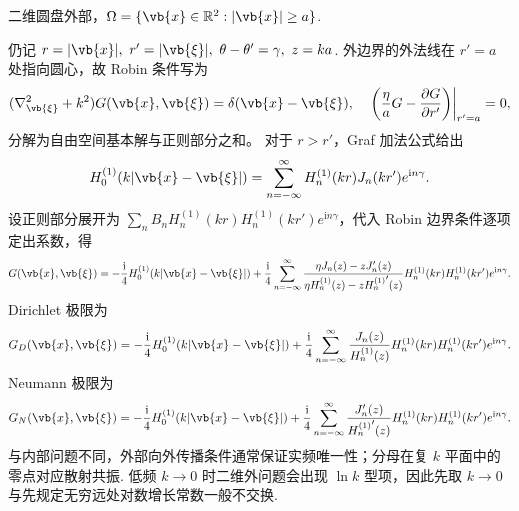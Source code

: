 \begin{example}
	二维圆盘外部，\(\Omega=\{\vb{x}\in\mathbb{R}^2:|\vb{x}|\geq a\}\).
	
	仍记 \(r=|\vb{x}|,\ r'=|\vb{\xi}|,\ \theta-\theta'=\gamma,\ z=ka\). 外边界的外法线在 \(r'=a\) 处指向圆心，故 Robin 条件写为
	\begin{equation*}
		(\nabla_{\vb{\xi}}^2+k^2)G(\vb{x},\vb{\xi})=\delta(\vb{x}-\vb{\xi}),
		\quad
		\left.\left(\frac{\eta}{a}G-\frac{\partial G}{\partial r'}\right)\right|_{r'=a}=0,
	\end{equation*}
	分解为自由空间基本解与正则部分之和。
	对于 \(r>r'\)，Graf 加法公式给出
	\begin{equation*}
		H_0^{(1)}(k|\vb{x}-\vb{\xi}|)=\sum_{n=-\infty}^{\infty}H_n^{(1)}(kr)J_n(kr')e^{\mathrm{i}n\gamma}.
	\end{equation*}
	设正则部分展开为 \(\sum_{n}B_nH_n^{(1)}(kr)H_n^{(1)}(kr')e^{\mathrm{i}n\gamma}\)，代入 Robin 边界条件逐项定出系数，得
	\begin{equation*}
		G(\vb{x},\vb{\xi})=-\frac{\mathrm{i}}{4}H_0^{(1)}(k|\vb{x}-\vb{\xi}|)
		+\frac{\mathrm{i}}{4}\sum_{n=-\infty}^{\infty}
		\frac{\eta J_n(z)-zJ_n'(z)}{\eta H_n^{(1)}(z)-z{H_n^{(1)}}'(z)}
		H_n^{(1)}(kr)H_n^{(1)}(kr')e^{\mathrm{i}n\gamma}.
	\end{equation*}
	Dirichlet 极限为
	\begin{equation*}
		G_D(\vb{x},\vb{\xi})=-\frac{\mathrm{i}}{4}H_0^{(1)}(k|\vb{x}-\vb{\xi}|)
		+\frac{\mathrm{i}}{4}\sum_{n=-\infty}^{\infty}
		\frac{J_n(z)}{H_n^{(1)}(z)}H_n^{(1)}(kr)H_n^{(1)}(kr')e^{\mathrm{i}n\gamma}.
	\end{equation*}
	Neumann 极限为
	\begin{equation*}
		G_N(\vb{x},\vb{\xi})=-\frac{\mathrm{i}}{4}H_0^{(1)}(k|\vb{x}-\vb{\xi}|)
		+\frac{\mathrm{i}}{4}\sum_{n=-\infty}^{\infty}
		\frac{J_n'(z)}{{H_n^{(1)}}'(z)}H_n^{(1)}(kr)H_n^{(1)}(kr')e^{\mathrm{i}n\gamma}.
	\end{equation*}
	与内部问题不同，外部向外传播条件通常保证实频唯一性；分母在复 \(k\) 平面中的零点对应散射共振. 低频 \(k\to0\) 时二维外问题会出现 \(\ln k\) 型项，因此先取 \(k\to0\) 与先规定无穷远处对数增长常数一般不交换.
\end{example}

